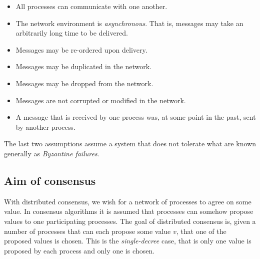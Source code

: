 \begin{itemize}
  \item All processes can communicate with one another.
  \item The network environment is \emph{asynchronous}. That is, messages may take an arbitrarily long time to be delivered.
  \item Messages may be re-ordered upon delivery.
  \item Messages may be duplicated in the network.
  \item Messages may be dropped from the network.
  \item Messages are not corrupted or modified in the network.
  \item A message that is received by one process was, at some point in the past, sent by another process.
\end{itemize}


The last two assumptions assume a system that does not tolerate what are known generally as \emph{Byzantine failures}.




\subsection{Aim of consensus}

With distributed consensus, we wish for a network of processes to agree on some value. In consensus algorithms it is assumed that processes can somehow propose values to one participating processes. The goal of distributed consensus is, given a number of processes that can each propose some value $v$, that one of the proposed values is chosen. This is the \emph{single-decree} case, that is only one value is proposed by each process and only one is chosen. \\

